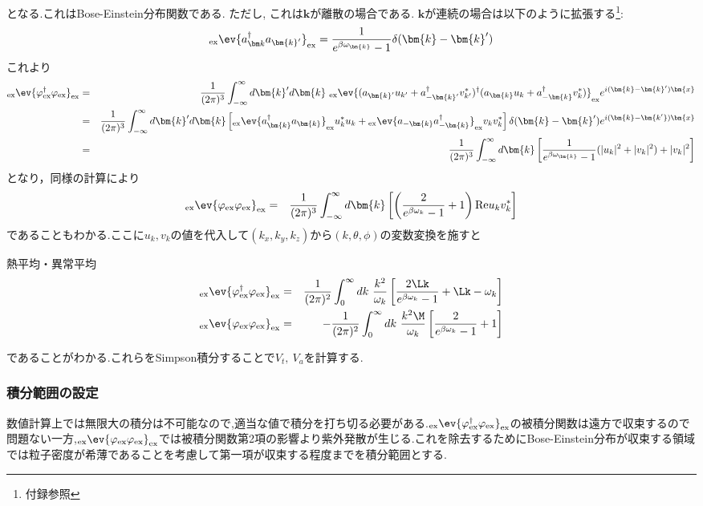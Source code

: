 \documentclass[10.5pt,a4paper]{jreport}
\begin{document}
となる.これはBose-Einstein分布関数である. ただし, これは$\bm{k}$が離散の場合である. $\bm{k}$が連続の場合は以下のように拡張する\footnote{付録参照}:
\begin{eqnarray}
  _{\rm ex}\ev{a_{\bm k}^\dagger a_{\bm{k}'}}_{\rm ex} = \frac{1}{e^{\beta\omega_{\bm{k}}}-1}\delta(\bm{k} - \bm{k}')
\end{eqnarray}
これより
\begin{eqnarray}
  \nonumber  _{\rm ex}\ev{\varphi^\dagger_{\rm ex}\varphi_{\rm ex}}_{\rm ex} &=& \frac{1}{(2\pi)^3}\int^{\infty}_{-\infty}  d \bm{k}' d \bm{k}\ {_{\rm ex}\ev{(a_{\bm{k}'}u_{k'}+a^\dagger_{-\bm{k}'}v^*_{k'})^\dagger(a_{\bm{k}}u_k+a^\dagger_{-\bm{k}}v^*_k)}_{\rm ex}}e^{i(\bm{k}-\bm{k}')\bm{x}}\\
  \nonumber  &=& \frac{1}{(2\pi)^3}\int^{\infty}_{-\infty} d \bm{k}' d \bm{k}\left[{_{\rm ex}\ev{a^\dagger_{\bm{k}}a_{\bm{k}}}_{\rm ex}}u^*_ku_k + {_{\rm ex}\ev{a_{-\bm{k}}a^\dagger_{-\bm{k}}}_{\rm ex}}v_kv^*_k\right]\delta(\bm{k}-\bm{k}')e^{i(\bm{k}-\bm{k'})\bm{x}}\\
  &=& \frac{1}{(2\pi)^3}\int^{\infty}_{-\infty} d\bm{k}\left[\frac{1}{e^{\beta\omega_{\bm{k}}}-1}(|u_k|^2+|v_k|^2)+|v_k|^2\right]
\end{eqnarray}
となり，同様の計算により
\begin{eqnarray}
  _{{\rm ex}}\ev{\varphi_{{\rm ex}}\varphi_{{\rm ex}}}_{{\rm ex}} &=& \frac{1}{(2\pi)^3}\int^\infty_{-\infty} d\bm{k}\left[\left(\frac{2}{e^{\beta\omega_k}-1}+1\right){\rm Re}u_kv^*_k\right]
\end{eqnarray}
であることもわかる.ここに$u_k,v_k$の値を代入して$(k_x, k_y, k_z)$から$(k, \theta, \phi)$の変数変換を施すと
\begin{itembox}[c]{熱平均・異常平均}
  \begin{eqnarray}
    _{\rm ex}\ev{\varphi^\dagger_{\rm ex}\varphi_{\rm ex}}_{\rm ex} &=& \frac{1}{(2\pi)^2} \int^{\infty}_0 dk\ \frac{k^2}{\omega_k}\left[\frac{2\Lk}{e^{\beta\omega_k} - 1} + \Lk - \omega_k\right]\\
    _{\rm ex}\ev{\varphi_{\rm ex}\varphi_{\rm ex}}_{\rm ex} &=& -\frac{1}{(2\pi)^2} \int^{\infty}_0 dk\ \frac{k^2\M}{\omega_k}\left[\frac{2}{e^{\beta\omega_k}-1}+1\right]
  \end{eqnarray}
\end{itembox}
であることがわかる.これらをSimpson積分することで$V_t,\ V_a$を計算する.
\subsubsection{積分範囲の設定}
数値計算上では無限大の積分は不可能なので,適当な値で積分を打ち切る必要がある.$_{\rm ex}\ev{\varphi^\dagger_{\rm ex}\varphi_{\rm ex}}_{\rm ex}$の被積分関数は遠方で収束するので問題ない一方,$_{\rm ex}\ev{\varphi_{\rm ex}\varphi_{\rm ex}}_{\rm ex}$では被積分関数第2項の影響より紫外発散が生じる.これを除去するためにBose-Einstein分布が収束する領域では粒子密度が希薄であることを考慮して第一項が収束する程度までを積分範囲とする.
\end{document}
